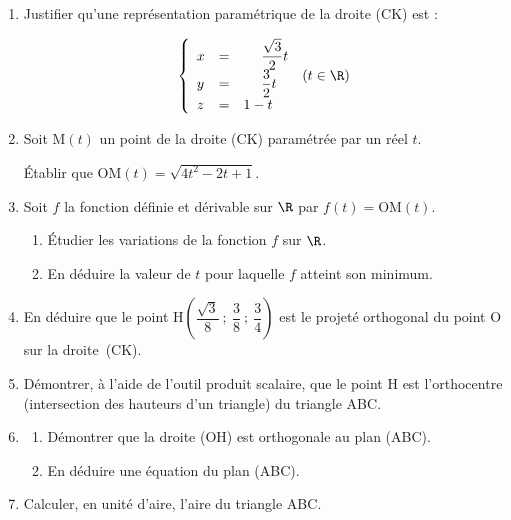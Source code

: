 \begin{enumerate}
\item Justifier qu'une représentation paramétrique de la droite (CK) est :

\renewcommand\arraystretch{1.7}
\[\left\{\begin{array}{l c l}
x&=&\phantom{1-}\dfrac{\sqrt 3}{2}t\\
y&=&\phantom{1-}\dfrac32 t\\
z&=&1 - t
\end{array}\right. \: (t \in \R)\]
\renewcommand\arraystretch{1.}

\item Soit M$(t)$ un point de la droite (CK) paramétrée par un réel $t$.

Établir que OM$(t) = \sqrt{4t^2 - 2t + 1}$.
\item Soit $f$ la fonction définie et dérivable sur $\R$ par $f(t) = \text{OM}(t)$.
	\begin{enumerate}
		\item Étudier les variations de la fonction $f$ sur $\R$.
		\item En déduire la valeur de $t$ pour laquelle $f$ atteint son minimum.
	\end{enumerate}
\item En déduire que le point H$\left(\dfrac{\sqrt3}{8}~;~\dfrac38~;~\dfrac34\right)$ est le projeté orthogonal du point O sur la droite~(CK).
\item Démontrer, à l'aide de l'outil produit scalaire, que le point H est l'orthocentre (intersection des hauteurs d'un triangle) du triangle ABC.
\item 
	\begin{enumerate}
		\item Démontrer que la droite (OH) est orthogonale au plan (ABC).
		\item En déduire une équation du plan (ABC). 
	\end{enumerate}
	\item Calculer, en unité d'aire, l'aire du triangle ABC.
\end{enumerate}
